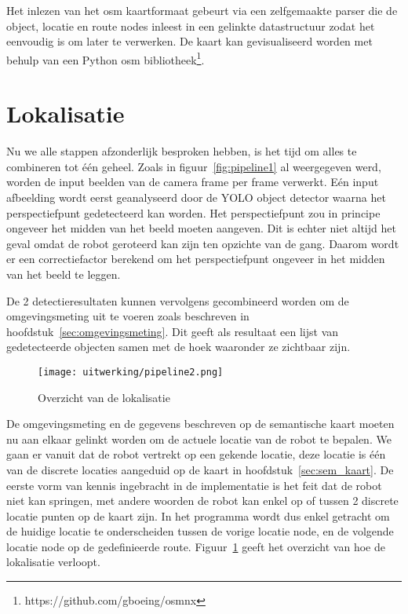 Het inlezen van het \gls{osm} kaartformaat gebeurt via een zelfgemaakte parser die de object, locatie en route nodes inleest in een gelinkte datastructuur
zodat het eenvoudig is om later te verwerken.
De kaart kan gevisualiseerd worden met behulp van een Python \gls{osm} bibliotheek\footnote{https://github.com/gboeing/osmnx}.


\section{Lokalisatie}\label{sec:lokalisatie}
Nu we alle stappen afzonderlijk besproken hebben, is het tijd om alles te combineren tot \'{e}\'{e}n geheel.
Zoals in figuur~\ref{fig:pipeline1} al weergegeven werd, worden de input beelden van de camera frame per frame verwerkt.
E\'{e}n input afbeelding wordt eerst geanalyseerd door de YOLO object detector waarna het perspectiefpunt gedetecteerd kan worden.
Het perspectiefpunt zou in principe ongeveer het midden van het beeld moeten aangeven.
Dit is echter niet altijd het geval omdat de robot geroteerd kan zijn ten opzichte van de gang.
Daarom wordt er een correctiefactor berekend om het perspectiefpunt ongeveer in het midden van het beeld te leggen.

De 2 detectieresultaten kunnen vervolgens gecombineerd worden om de omgevingsmeting uit te voeren zoals beschreven in hoofdstuk~\ref{sec:omgevingsmeting}.
Dit geeft als resultaat een lijst van gedetecteerde objecten samen met de hoek waaronder ze zichtbaar zijn.

\begin{figure}[t]
    \centering
    \texttt{[image: uitwerking/pipeline2.png]}
    \caption{Overzicht van de lokalisatie}
    \label{fig:pipeline2}
\end{figure}

De omgevingsmeting en de gegevens beschreven op de semantische kaart moeten nu aan elkaar gelinkt worden om de actuele locatie van de robot te bepalen.
We gaan er vanuit dat de robot vertrekt op een gekende locatie, deze locatie is \'{e}\'{e}n van de discrete locaties aangeduid op de kaart in hoofdstuk~\ref{sec:sem_kaart}.
De eerste vorm van kennis ingebracht in de implementatie is het feit dat de robot niet kan springen, met andere woorden de robot kan enkel op of tussen 2 discrete locatie punten op de kaart zijn.
In het programma wordt dus enkel getracht om de huidige locatie te onderscheiden tussen de vorige locatie node, en de volgende locatie node op de gedefinieerde route.
Figuur~\ref{fig:pipeline2} geeft het overzicht van hoe de lokalisatie verloopt.

